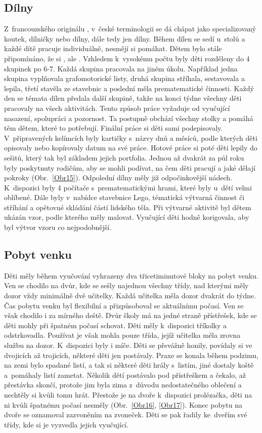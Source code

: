 		\subsection{Dílny}
		\label{dilny}
			Z~francouzského originálu , v~české terminologii se dá chápat jako specializovaný koutek, dílničky nebo dílny, dále tedy jen dílny. 
			Během dílen se sedí u~stolů a každé dítě pracuje individuálně, nesmějí si pomáhat. Dětem bylo stále připomínáno, že si , ale . Vzhledem k~vysokému počtu byly děti rozděleny do 4 skupinek po 6-7. Každá skupina pracovala na jiném úkolu. Například jedna skupina vyplňovala grafomotorické listy, druhá skupina stříhala, sestavovala a lepila, třetí stavěla ze stavebnic a poslední měla prematematické činnosti. Každý den se témata dílen předala další skupině, takže na konci týdne všechny děti pracovaly na všech aktivitách. Tento způsob práce vyžaduje od vyučující nasazení, spolupráci a pozornost. Ta postupně obchází všechny stolky a pomáhá těm dětem, které to potřebují. Finální práce si děti sami podepisovaly. V~připravených kelímcích byly kartičky s~názvy dnů a měsíců, podle kterých děti opisovaly nebo kopírovaly datum na své práce. Hotové práce si poté děti lepily do sešitů, který tak byl základem jejich portfolia. Jednou až dvakrát za půl roku byly poskytnuty rodičům, aby se mohli podívat, na čem děti pracují a jaké dělají pokroky (Obr.~\ref{Obr15}). Odpolední dílny měly již odpočinkovější nádech. K~dispozici byly 4 počítače s~prematematickými hrami, které byly u~dětí velmi oblíbené. Dále byly v~nabídce stavebnice Lego, tématická výtvarná činnost či stříhání a opětovné skládání částí lidského těla. Při výtvarné aktivitě byl dětem ukázán vzor, podle kterého měly malovat. Vyučující děti hodně korigovala, aby byl výtvor vzoru co nejpodobnější.


		\subsection{Pobyt venku}
		\label{prestavka}
			Děti měly během vyučování vyhrazeny dva třicetiminutové bloky na pobyt venku. Ven se chodilo na dvůr, kde se sešly najednou všechny třídy, nad kterými měly dozor vždy minimálně dvě učitelky. Každá učitelka měla dozor dvakrát do týdne. Čas pobytu venku byl flexibilní a přizpůsoboval se aktuálnímu počasí. Ven se však chodilo i za mírného deště. Dvůr školy má na jedné straně přístřešek, kde se děti mohly při špatném počasí schovat. Děti měly k dispozici tříkolky a odstrkovadla. Používat je však mohla pouze třída, jejíž učitelka měla zrovna službu na dozor. K dispozici byly i míče. Děti se převážně honily, povídaly si ve dvojicích až trojicích, některé děti jen postávaly. Praxe se konala během podzimu, na zemi bylo spadané listí, a tak si některé děti hrály s listím, jiné dostaly koště a pomáhaly listí zametat. Několik dětí postávalo pod přístřeškem a čekalo, až přestávka skončí, protože jim byla zima z důvodu nedostatečného oblečení a nechtěly si kvůli tomu hrát. Přestože je na dvoře k dispozici prolézačka, děti na ni kvůli špatnému počasí nesměly (Obr.~\ref{Obr16}, \ref{Obr17}). 
			Konec pobytu na dvoře se oznamoval zazvoněním na zvoneček. Děti se pak řadily ke dveřím své třídy, kde si je vyzvedla jejich vyučující. 

